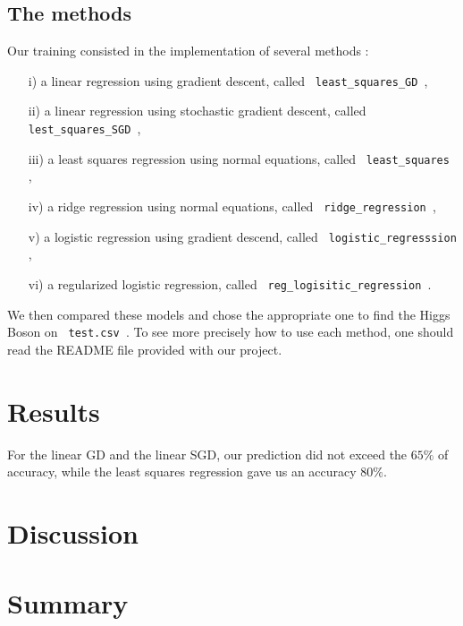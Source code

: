 \documentclass[11pt, oneside]{article}   	%
\begin{document}
\subsection{The methods}

Our training consisted in the implementation of several methods : \begin{itemize}
\item[i)] a linear regression using gradient descent, called \lstinline" least_squares_GD ",
\item[ii)] a linear regression using stochastic gradient descent, called \lstinline" lest_squares_SGD ",
\item[iii)] a least squares regression using normal equations, called \lstinline" least_squares ",
\item[iv)] a ridge regression using normal equations, called \lstinline" ridge_regression ",
\item[v)] a logistic regression using gradient descend, called \lstinline" logistic_regresssion ",
\item[vi)] a regularized logistic regression, called \lstinline" reg_logisitic_regression ".
\end{itemize} 
We then compared these models and chose the appropriate one to find the Higgs Boson on \lstinline! test.csv !. To see more precisely how to use each method, one should read the README file provided with our project.

\section{Results}

For the linear GD and the linear SGD, our prediction did not exceed the $65\%$ of accuracy, while the least squares regression gave us an accuracy $80\%$.

\section{Discussion}

\section{Summary}


\end{document}
